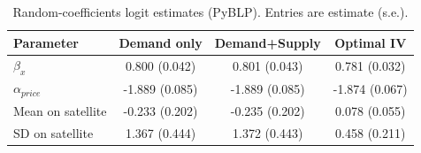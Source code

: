\begin{table}[H]
\centering
\caption{Random-coefficients logit estimates (PyBLP). Entries are estimate (s.e.).}
\begin{tabular}{lccc}
\hline
Parameter & Demand only & Demand+Supply & Optimal IV\\
\hline
$\beta_x$ & 0.800 (0.042) & 0.801 (0.043) & 0.781 (0.032)\\
$\alpha_{price}$ & -1.889 (0.085) & -1.889 (0.085) & -1.874 (0.067)\\
Mean on satellite & -0.233 (0.202) & -0.235 (0.202) & 0.078 (0.055)\\
SD on satellite & 1.367 (0.444) & 1.372 (0.443) & 0.458 (0.211)\\
\hline
\end{tabular}
\end{table}
